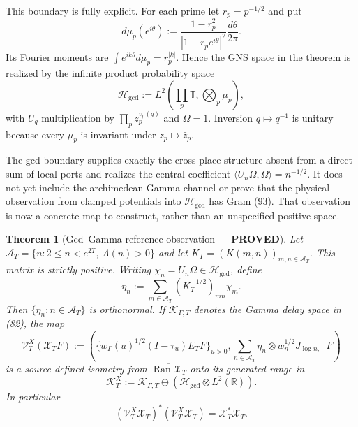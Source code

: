 \documentclass[11pt]{article}
\newtheorem{theorem}{Theorem}
\newcommand{\PROVED}{\textcolor{green!45!black}{\textbf{PROVED}}}
\newcommand{\Ran}{\operatorname{Ran}}
\begin{document}
This boundary is fully explicit.  For each prime let $r_p=p^{-1/2}$ and put
\begin{equation}
 d\mu_p(e^{i\theta})
 :=\frac{1-r_p^2}{|1-r_pe^{i\theta}|^2}\frac{d\theta}{2\pi}. \tag{136}
\end{equation}
Its Fourier moments are
$\int e^{ik\theta}d\mu_p=r_p^{|k|}$.  Hence the GNS space in the theorem is
realized by the infinite product probability space
\begin{equation}
 \mathscr H_{\gcd}:=L^2\left(\prod_p\mathbb T,
                              \bigotimes_p\mu_p\right), \tag{137}
\end{equation}
with $U_q$ multiplication by
$\prod_pz_p^{v_p(q)}$ and $\Omega=1$.  Inversion
$q\mapsto q^{-1}$ is unitary because every $\mu_p$ is invariant under
$z_p\mapsto\bar z_p$.

The gcd boundary supplies exactly the cross-place structure absent from a
direct sum of local ports and realizes the central coefficient
$\langle U_n\Omega,\Omega\rangle=n^{-1/2}$.  It does not yet include the
archimedean Gamma channel or prove that the physical observation from
clamped potentials into $\mathscr H_{\gcd}$ has Gram (93).  That observation
is now a concrete map to construct, rather than an unspecified positive
space.

\begin{theorem}[Gcd--Gamma reference observation --- \PROVED]
Let $\mathcal A_T=\{n:2\le n<e^{2T},\ \Lambda(n)>0\}$ and let
$K_T=(K(m,n))_{m,n\in\mathcal A_T}$.  This matrix is strictly positive.
Writing $\chi_n=U_n\Omega\in\mathscr H_{\gcd}$, define
\begin{equation}
 \eta_n:=\sum_{m\in\mathcal A_T}
          (K_T^{-1/2})_{mn}\chi_m.                    \tag{138}
\end{equation}
Then $\{\eta_n:n\in\mathcal A_T\}$ is orthonormal.  If
$\mathscr K_{\Gamma,T}$ denotes the Gamma delay space in (82), the map
\begin{equation}
 \mathcal V_T^X(\mathcal X_TF):=
 \left(
   \{w_\Gamma(u)^{1/2}(I-\tau_u)E_TF\}_{u>0},
   \sum_{n\in\mathcal A_T}\eta_n\otimes
        w_n^{1/2}J_{\log n,-}F
 \right)                                               \tag{139}
\end{equation}
is a source-defined isometry from
$\overline{\Ran\mathcal X_T}$ onto its generated range in
\begin{equation}
 \mathscr K_T^X:=\mathscr K_{\Gamma,T}
 \oplus(\mathscr H_{\gcd}\otimes L^2(\mathbb R)).      \tag{140}
\end{equation}
In particular
\begin{equation}
 (\mathcal V_T^X\mathcal X_T)^*
 (\mathcal V_T^X\mathcal X_T)=\mathcal X_T^*\mathcal X_T. \tag{141}
\end{equation}
\end{theorem}
\end{document}
